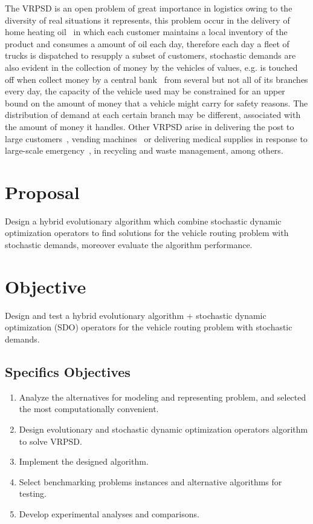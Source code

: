 The VRPSD is an open problem of great importance in logistics owing to the diversity of real situations it represents, this problem occur in the delivery of home heating oil~\cite{dror_computational_1985} in which each customer maintains a local inventory of the product and consumes a amount of oil each day, therefore each day a fleet of trucks is dispatched to resupply a subset of customers, stochastic demands are also evident in the collection of money by the vehicles of values, e.g. is touched off when collect money by a central bank~\cite{jianhua_fan_multiple_2006} from several but not all of its branches every day, the capacity of the vehicle used may be constrained for an upper bound on the amount of money that a vehicle might carry for safety reasons. The distribution of demand at each certain branch may be different, associated with the amount of money it handles. Other VRPSD arise in delivering the post to large customers~\cite{Markovic_2005}, vending machines~\cite{yang_stochastic_2000} or delivering medical supplies in response to large-scale emergency~\cite{dessouky_rapid_2006}, in recycling and waste management, among others.

\section{Proposal}

Design a hybrid evolutionary algorithm which combine stochastic dynamic optimization operators to find solutions for the vehicle routing problem with stochastic demands, moreover evaluate the algorithm performance.


\section{Objective}

Design and test a hybrid evolutionary algorithm + stochastic dynamic optimization (SDO) operators for the vehicle routing problem with stochastic demands.

\subsection{Specifics Objectives}

\begin{enumerate}
 \item Analyze the alternatives for modeling and representing problem, and selected the most computationally convenient.
 \item Design evolutionary and stochastic dynamic optimization operators algorithm to solve VRPSD.
 \item Implement the designed algorithm.
 \item Select benchmarking problems instances and alternative algorithms for testing.
 \item Develop experimental analyses and comparisons.
\end{enumerate}

